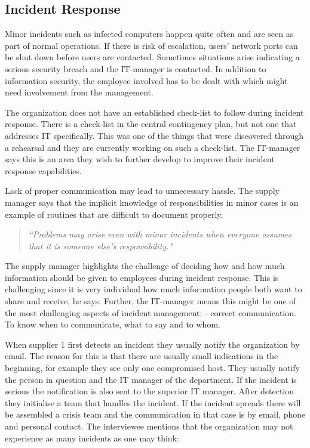 \subsection{Incident Response}
Minor incidents such as infected computers happen quite often and are seen as part of normal operations. If there is risk of escalation, users' network ports can be shut down before users are contacted. Sometimes situations arise indicating a serious security breach and the IT-manager is contacted. In addition to information security, the employee involved has to be dealt with which might need involvement from the management.

The organization does not have an established check-list to follow during incident response. There is a check-list in the central contingency plan, but not one that addresses IT specifically. This was one of the things that were discovered through a rehearsal and they are currently working on such a check-list. The IT-manager says this is an area they wish to further develop to improve their incident response capabilities. 

Lack of proper communication may lead to unnecessary hassle. The supply manager says that the implicit knowledge of responsibilities in minor cases is an example of routines that are difficult to document properly.
\begin{quote}
\textit{``Problems may arise even with minor incidents when everyone assumes that it is someone else's responsibility."}
\end{quote}

The supply manager highlights the challenge of deciding how and how much information should be given to employees during incident response. This is challenging since it is very individual how much information people both want to share and receive, he says. Further, the IT-manager means this might be one of the most challenging aspects of incident management; - correct communication. To know when to communicate, what to say and to whom. 

When supplier 1 first detects an incident they usually notify the organization by email. The reason for this is that there are usually small indications in the beginning, for example they see only one compromised host. They usually notify the person in question and the IT manager of the department. If the incident is serious the notification is also sent to the superior IT manager. After detection they initialise a team that handles the incident. If the incident spreads there will be assembled a crisis team and the communication in that case is by email, phone and personal contact. The interviewee mentions that the organization may not experience as many incidents as one may think:

